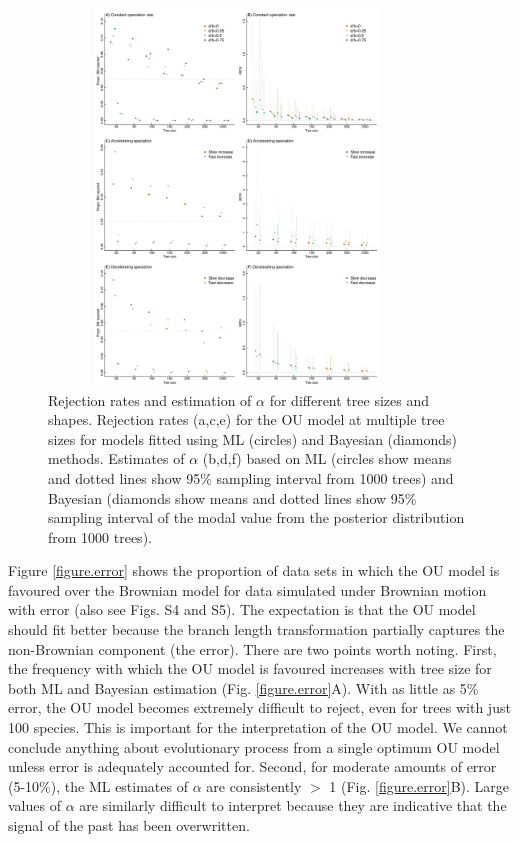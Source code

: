 \documentclass[a4paper,12pt]{article}
\begin{document}
\begin{figure}
  \centering
  \includegraphics[width=10cm, height=10cm, keepaspectratio=true]{Figures/OU_figure4.pdf}
  \caption{Rejection rates and estimation of $\alpha$ for different tree sizes and shapes. Rejection rates (a,c,e) for the OU model at multiple tree sizes for models fitted using ML (circles) and Bayesian (diamonds) methods. Estimates of $\alpha$ (b,d,f) based on ML (circles show means and dotted lines show 95\% sampling interval from 1000 trees) and Bayesian (diamonds show means and dotted lines show 95\% sampling interval of the modal value from the posterior distribution from 1000 trees).}
\label{figure.rejection}
\end{figure}

Figure \ref{figure.error} shows the proportion of data sets in which the OU model is favoured over the Brownian model for data simulated under Brownian motion with error (also see Figs. S4 and S5). The expectation is that the OU model should fit better because the branch length transformation partially captures the non-Brownian component (the error). There are two points worth noting. First, the frequency with which the OU model is favoured increases with tree size for both ML and Bayesian estimation (Fig. \ref{figure.error}A). With as little as 5\% error, the OU model becomes extremely difficult to reject, even for trees with just 100 species. This is important for the interpretation of the OU model. We cannot conclude anything about evolutionary process from a single optimum OU model unless error is adequately accounted for. Second, for moderate amounts of error (5-10\%), the ML estimates of $\alpha$ are consistently $>$ 1 (Fig. \ref{figure.error}B). Large values of $\alpha$ are similarly difficult to interpret because they are indicative that the signal of the past has been overwritten. 
\end{document}
